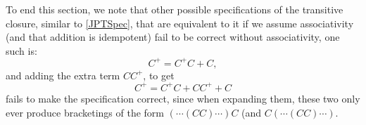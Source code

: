 To end this section, we note that other possible specifications of the transitive closure, similar to \eqref{JPTSpec}, that are equivalent to it if we assume associativity (and that addition is idempotent) fail to be correct without associativity, one such is:
\begin{equation}
  C^+ = C^+C + C,
\end{equation}
and adding the extra term $CC^+$, to get
\begin{equation}
  C^+ = C^+C + CC^+ + C
\end{equation}
fails to make the specification correct, since when expanding them, these two only ever produce bracketings of the form $(\cdots(CC)\cdots) C$ (and $C(\cdots(CC)\cdots)$.


